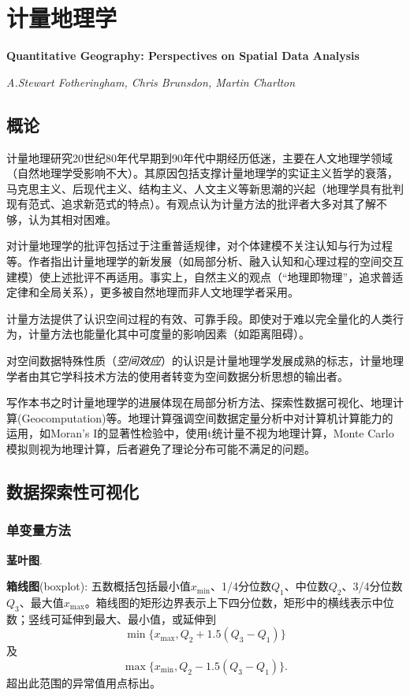 
\chapter{计量地理学}
\Large\textbf{Quantitative Geography: Perspectives on Spatial Data Analysis}
\par \emph{A.Stewart Fotheringham, Chris Brunsdon, Martin Charlton} \normalsize

\section{概论}
\par 计量地理研究20世纪80年代早期到90年代中期经历低迷，主要在人文地理学领域（自然地理学受影响不大）。其原因包括支撑计量地理学的实证主义哲学的衰落，马克思主义、后现代主义、结构主义、人文主义等新思潮的兴起（地理学具有批判现有范式、追求新范式的特点）。有观点认为计量方法的批评者大多对其了解不够，认为其相对困难。

\par 对计量地理学的批评包括过于注重普适规律，对个体建模不关注认知与行为过程等。作者指出计量地理学的新发展（如局部分析、融入认知和心理过程的空间交互建模）使上述批评不再适用。事实上，自然主义的观点（“地理即物理”，追求普适定律和全局关系），更多被自然地理而非人文地理学者采用。

\par 计量方法提供了认识空间过程的有效、可靠手段。即使对于难以完全量化的人类行为，计量方法也能量化其中可度量的影响因素（如距离阻碍）。

\par 对空间数据特殊性质（\emph{空间效应}）的认识是计量地理学发展成熟的标志，计量地理学者由其它学科技术方法的使用者转变为空间数据分析思想的输出者。

\par 写作本书之时计量地理学的进展体现在局部分析方法、探索性数据可视化、地理计算(Geocomputation)等。地理计算强调空间数据定量分析中对计算机计算能力的运用，如Moran's I的显著性检验中，使用t统计量不视为地理计算，Monte Carlo模拟则视为地理计算，后者避免了理论分布可能不满足的问题。

\section{数据探索性可视化}

\subsection{单变量方法}

\par \textbf{茎叶图}.
\par \textbf{箱线图}(boxplot): 五数概括包括最小值$x_{\min}$、1/4分位数$Q_1$、中位数$Q_2$、3/4分位数$Q_3$、最大值$x_{\max}$。箱线图的矩形边界表示上下四分位数，矩形中的横线表示中位数；竖线可延伸到最大、最小值，或延伸到
\begin{equation}
    \min \{x_{\max}, Q_2+1.5(Q_3-Q_1)\}
\end{equation}
及
\begin{equation}
    \max \{x_{\min}, Q_2-1.5(Q_3-Q_1)\}.
\end{equation}
超出此范围的异常值用点标出。

